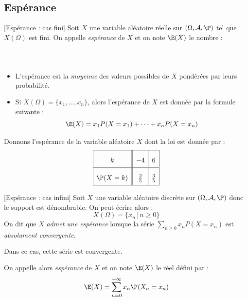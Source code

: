 \documentclass[french,11pt,twoside]{VcCours}
\begin{document}
\subsection{Espérance}


\begin{Definition}{}[Espérance : cas fini]
Soit $X$ une variable aléatoire réelle sur $(\Omega, \mathcal{A}, \P)$ tel que $X(\Omega)$ est fini. On appelle \emph{espérance} de $X$ et on note $\E(X)$ le nombre :
 $$ \phantom{\E (X) = \sum_{x \in X(\Omega)}x  \P\big(X=x\big)}$$
\end{Definition}

\begin{Remarques}{}
\begin{itemize}
\item L'espérance est la \emph{moyenne} des valeurs possibles de $X$ pondérées par leurs probabilité.
\item Si $X(\Omega) = \{x_1,\ldots,x_n\}$, alors l'espérance de $X$ est donnée par la formule suivante :
 $$ \E(X) = x_1 P(X=x_1) + \cdots + x_n P(X=x_n)$$
\end{itemize}
\end{Remarques}

\begin{Exemple}{} Donnons l'espérance de la variable aléatoire $X$ dont la loi est donnée par :
$$\renewcommand{\arraystretch}{2.1}\begin{array}{|c||c|c|}
\hline
k & -4 & 6\\
\hline
\P(X=k) & \tfrac 2 5 & \tfrac 3 5\\
\hline
\end{array}$$

\vspace{2cm}
\end{Exemple}


\begin{Definition}{}[Espérance : cas infini]
Soit $X$ une variable aléatoire discrète sur $(\Omega, \mathcal{A}, \P)$ donc le support est dénombrable. On peut écrire alors :
$$ X(\Omega) = \lbrace x_n \, \vert \, n \geq 0 \rbrace$$
On dit que $X$ \emph{admet une espérance} lorsque la série $\sum_{n \geq 0} x_n P(X=x_n)$ est \emph{absolument convergente}.


Dans ce cas, cette série est convergente.


On appelle alors \emph{espérance} de $X$ et on note $\E(X)$ le réel défini par :
$$\E(X) = \sum\limits_{n = 0}^{+ \infty} x_n \P(X_n=x_n ) $$
\end{Definition}
\end{document}
